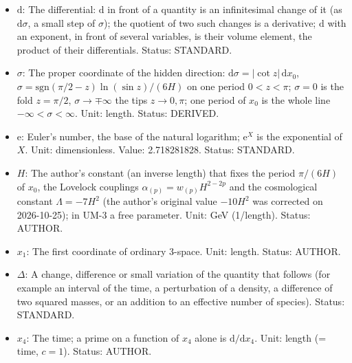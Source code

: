 \documentclass[
  10pt,
]{article}
\providecommand{\tightlist}{%
  \setlength{\itemsep}{0pt}\setlength{\parskip}{0pt}}
\begin{document}
\begin{itemize}
\tightlist
\item
  \(\mathrm{d}\): The differential: \(\mathrm{d}\) in front of a
  quantity is an infinitesimal change of it (as \(\mathrm{d}\sigma\), a
  small step of \(\sigma\)); the quotient of two such changes is a
  derivative; \(\mathrm{d}\) with an exponent, in front of several
  variables, is their volume element, the product of their
  differentials. Status: STANDARD.
\item
  \(\sigma\): The proper coordinate of the hidden direction:
  \(\mathrm{d}\sigma = \lvert\cot z\rvert\,\mathrm{d}x_0\),
  \(\sigma = \mathrm{sgn}(\pi/2 - z)\ln(\sin z)/(6H)\) on one period
  \(0 < z < \pi\); \(\sigma = 0\) is the fold \(z = \pi/2\),
  \(\sigma \to \mp\infty\) the tips \(z \to 0, \pi\); one period of
  \(x_0\) is the whole line \(-\infty < \sigma < \infty\). Unit: length.
  Status: DERIVED.
\item
  \(\mathrm{e}\): Euler's number, the base of the natural logarithm;
  \(\mathrm{e}^{X}\) is the exponential of \(X\). Unit: dimensionless.
  Value: 2.718281828. Status: STANDARD.
\item
  \(H\): The author's constant (an inverse length) that fixes the period
  \(\pi/(6H)\) of \(x_0\), the Lovelock couplings
  \(\alpha_{(p)} = w_{(p)}H^{2-2p}\) and the cosmological constant
  \(\Lambda = -7H^2\) (the author's original value \(-10H^2\) was
  corrected on 2026-10-25); in UM-3 a free parameter. Unit: GeV
  (1/length). Status: AUTHOR.
\item
  \(x_1\): The first coordinate of ordinary 3-space. Unit: length.
  Status: AUTHOR.
\item
  \(\Delta\): A change, difference or small variation of the quantity
  that follows (for example an interval of the time, a perturbation of a
  density, a difference of two squared masses, or an addition to an
  effective number of species). Status: STANDARD.
\item
  \(x_4\): The time; a prime on a function of \(x_4\) alone is
  \(\mathrm{d}/\mathrm{d}x_4\). Unit: length (= time, \(c = 1\)).
  Status: AUTHOR.
\end{itemize}
\end{document}
